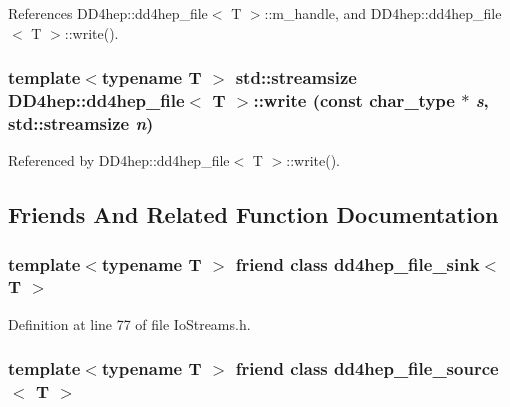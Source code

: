 References DD4hep::dd4hep\_\-file$<$ T $>$::m\_\-handle, and DD4hep::dd4hep\_\-file$<$ T $>$::write().\hypertarget{class_d_d4hep_1_1dd4hep__file_a33bb5fb24cdaf006ff9143d0d03f9bd3}{
\subsubsection[{write}]{\setlength{\rightskip}{0pt plus 5cm}template$<$typename T $>$ std::streamsize {\bf DD4hep::dd4hep\_\-file}$<$ {\bf T} $>$::write (const {\bf char\_\-type} $\ast$ {\em s}, \/  std::streamsize {\em n})}}
\label{class_d_d4hep_1_1dd4hep__file_a33bb5fb24cdaf006ff9143d0d03f9bd3}


Referenced by DD4hep::dd4hep\_\-file$<$ T $>$::write().

\subsection{Friends And Related Function Documentation}
\hypertarget{class_d_d4hep_1_1dd4hep__file_a0fff7b3c8e8c9c913c387a26c6829a36}{
\subsubsection[{dd4hep\_\-file\_\-sink$<$ T $>$}]{\setlength{\rightskip}{0pt plus 5cm}template$<$typename T $>$ friend class {\bf dd4hep\_\-file\_\-sink}$<$ {\bf T} $>$}}
\label{class_d_d4hep_1_1dd4hep__file_a0fff7b3c8e8c9c913c387a26c6829a36}


Definition at line 77 of file IoStreams.h.\hypertarget{class_d_d4hep_1_1dd4hep__file_a6b3fcc7f94c708f7b47316d1ac4b1cf4}{
\subsubsection[{dd4hep\_\-file\_\-source$<$ T $>$}]{\setlength{\rightskip}{0pt plus 5cm}template$<$typename T $>$ friend class {\bf dd4hep\_\-file\_\-source}$<$ {\bf T} $>$}}
\label{class_d_d4hep_1_1dd4hep__file_a6b3fcc7f94c708f7b47316d1ac4b1cf4}


